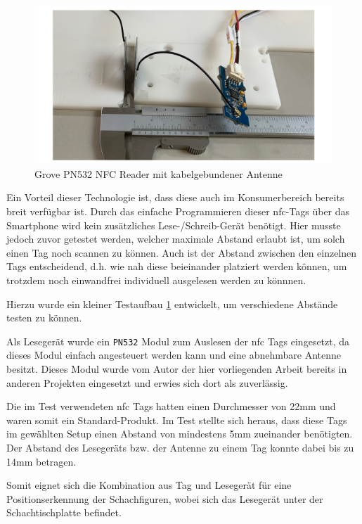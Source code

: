 \begin{figure}
\centering
\includegraphics{images/ATC_nfc_range_test.png}
\caption{Grove PN532 NFC Reader mit kabelgebundener Antenne
\label{ATC_nfc_range_test}}
\end{figure}

Ein Vorteil dieser Technologie ist, dass diese auch im Konsumerbereich
bereits breit verfügbar ist. Durch das einfache Programmieren dieser
\gls{nfc}-Tags über das Smartphone wird kein zusätzliches
Lese-/Schreib-Gerät benötigt. Hier musste jedoch zuvor getestet werden,
welcher maximale Abstand erlaubt ist, um solch einen Tag noch scannen zu
können. Auch ist der Abstand zwischen den einzelnen Tags entscheidend,
d.h. wie nah diese beieinander platziert werden können, um trotzdem noch
einwandfrei individuell ausgelesen werden zu könnnen.

Hierzu wurde ein kleiner Testaufbau \ref{ATC_nfc_range_test} entwickelt,
um verschiedene Abstände testen zu können.

Als Lesegerät wurde ein \passthrough{\lstinline!PN532!} Modul zum
Auslesen der \gls{nfc} Tags eingesetzt, da dieses Modul einfach
angesteuert werden kann und eine abnehmbare Antenne besitzt. Dieses
Modul wurde vom Autor der hier vorliegenden Arbeit bereits in anderen
Projekten eingesetzt und erwies sich dort als zuverlässig.

Die im Test verwendeten \gls{nfc} Tags hatten einen Durchmesser von 22mm
und waren somit ein Standard-Produkt. Im Test stellte sich heraus, dass
diese Tags im gewählten Setup einen Abstand von mindestens 5mm
zueinander benötigten. Der Abstand des Lesegeräts bzw. der Antenne zu
einem Tag konnte dabei bis zu 14mm betragen.

Somit eignet sich die Kombination aus Tag und Lesegerät für eine
Positionserkennung der Schachfiguren, wobei sich das Lesegerät unter der
Schachtischplatte befindet.

